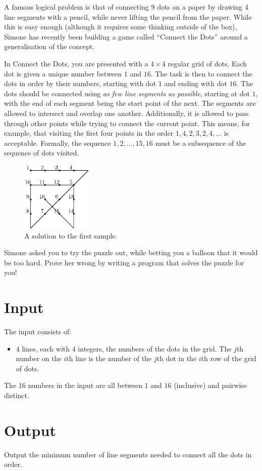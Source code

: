 A famous logical problem is that of connecting 9 dots on a paper by drawing 4 line segments with a pencil, while never lifting the pencil from the paper.
While this is easy enough (although it requires some thinking outside of the box), Simone has recently been building a game called ``Connect the Dots'' around a generalisation of the concept.

In Connect the Dots, you are presented with a $4 \times 4$ regular grid of dots.
Each dot is given a unique number between $1$ and $16$.
The task is then to connect the dots in order by their numbers, starting with dot $1$ and ending with dot $16$.
The dots should be connected using \emph{as few line segments as possible}, starting at dot $1$, with the end of each segment being the start point of the next.
The segments are allowed to intersect and overlap one another.
Additionally, it is allowed to pass through other points while trying to connect the current point.
This means, for example, that visiting the first four points in the order $1, 4, 2, 3, 2, 4, \dots$ is acceptable.
Formally, the sequence $1, 2, \dots, 15, 16$ must be a subsequence of the sequence of dots visited.

\begin{figure}[h!]
\centering
\includegraphics[width=0.3\textwidth]{sample.eps}
\caption{A solution to the first sample.}
\end{figure}

Simone asked you to try the puzzle out, while betting you a balloon that it would be too hard.
Prove her wrong by writing a program that solves the puzzle for you!

\section*{Input}
The input consists of:
\begin{itemize}
\item $4$ lines, each with $4$ integers, the numbers of the dots in the grid.
      The $j$th number on the $i$th line is the number of the $j$th dot in the $i$th row of the grid of dots.
\end{itemize}
The $16$ numbers in the input are all between $1$ and $16$ (inclusive) and pairwise distinct.

\section*{Output}
Output the minimum number of line segments needed to connect all the dots in order.
